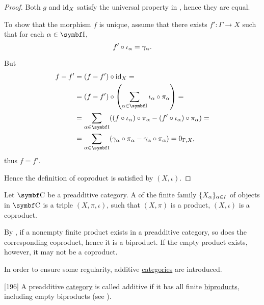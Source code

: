 \begin{proof}
  Both \( g \) and \( \operatorname{id}_X \) satisfy the universal property in , hence they are equal.

  To show that the morphism \( f \) is unique, assume that there exists \( f': \Gamma \to X \) such that for each \( \al \in \Cat{I} \),
  \begin{equation*}
    f' \circ \iota_\alpha = \gamma_\alpha.
  \end{equation*}

  But
  \begin{align*}
    f - f'
    &=
    (f - f') \circ \Id_X
    = \\ &=
    (f - f') \circ \left( \sum_{\al \in \Cat{I}} \iota_\al \circ \pi_\al \right)
    = \\ &=
    \sum_{\al \in \Cat{I}} ((f \circ \iota_\al) \circ \pi_\al - (f' \circ \iota_\al) \circ \pi_\al)
    = \\ &=
    \sum_{\al \in \Cat{I}} (\gamma_\al \circ \pi_\al - \gamma_\al \circ \pi_\al)
    =
    0_{\Gamma,X},
  \end{align*}
  thus \( f = f' \).

  Hence the definition of coproduct is satisfied by \( (X, \iota) \).
\end{proof}

\begin{definition}\label{def:categorical_biproduct}
  Let \( \Cat{C} \) be a preadditive category. A  of the finite family \( \{ X_\alpha \}_{\alpha \in I} \) of objects in \( \Cat{C} \) is a triple \( (X, \pi, \iota) \), such that \( (X, \pi) \) is a product, \( (X, \iota) \) is a coproduct.
\end{definition}

\begin{remark}\label{remark:preadditive_category_biproducts}
  By , if a nonempty finite product exists in a preadditive category, so does the corresponding coproduct, hence it is a biproduct. If the empty product exists, however, it may not be a coproduct.

  In order to ensure some regularity, additive \hyperref[def:additive_category]{categories} are introduced.
\end{remark}

\begin{definition}\label{def:additive_category}\cite{MacLane1994}[196]
  A preadditive \hyperref[def:preadditive_category]{category} is called additive if it has all finite \hyperref[def:categorical_biproduct]{biproducts}, including empty biproducts (see ).
\end{definition}


